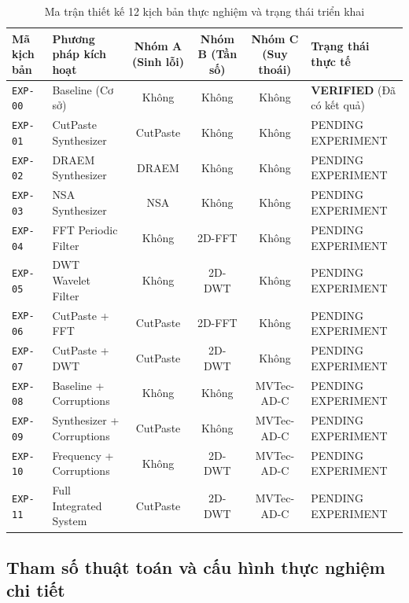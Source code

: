\begin{table}[h]
\centering
\caption{Ma trận thiết kế 12 kịch bản thực nghiệm và trạng thái triển khai}
\label{tab:ablation_matrix_design}
\begin{tabularx}{\textwidth}{l p{3.2cm} c c c l}
\toprule
\textbf{Mã kịch bản} & \textbf{Phương pháp kích hoạt} & \textbf{Nhóm A (Sinh lỗi)} & \textbf{Nhóm B (Tần số)} & \textbf{Nhóm C (Suy thoái)} & \textbf{Trạng thái thực tế} \\
\midrule
\texttt{EXP-00} & Baseline (Cơ sở) & Không & Không & Không & \textbf{VERIFIED} (Đã có kết quả) \\
\texttt{EXP-01} & CutPaste Synthesizer & CutPaste & Không & Không & PENDING EXPERIMENT \\
\texttt{EXP-02} & DRAEM Synthesizer & DRAEM & Không & Không & PENDING EXPERIMENT \\
\texttt{EXP-03} & NSA Synthesizer & NSA & Không & Không & PENDING EXPERIMENT \\
\texttt{EXP-04} & FFT Periodic Filter & Không & 2D-FFT & Không & PENDING EXPERIMENT \\
\texttt{EXP-05} & DWT Wavelet Filter & Không & 2D-DWT & Không & PENDING EXPERIMENT \\
\texttt{EXP-06} & CutPaste + FFT & CutPaste & 2D-FFT & Không & PENDING EXPERIMENT \\
\texttt{EXP-07} & CutPaste + DWT & CutPaste & 2D-DWT & Không & PENDING EXPERIMENT \\
\texttt{EXP-08} & Baseline + Corruptions & Không & Không & MVTec-AD-C & PENDING EXPERIMENT \\
\texttt{EXP-09} & Synthesizer + Corruptions & CutPaste & Không & MVTec-AD-C & PENDING EXPERIMENT \\
\texttt{EXP-10} & Frequency + Corruptions & Không & 2D-DWT & MVTec-AD-C & PENDING EXPERIMENT \\
\texttt{EXP-11} & Full Integrated System & CutPaste & 2D-DWT & MVTec-AD-C & PENDING EXPERIMENT \\
\bottomrule
\end{tabularx}
\end{table}

\subsection{Tham số thuật toán và cấu hình thực nghiệm chi tiết}

